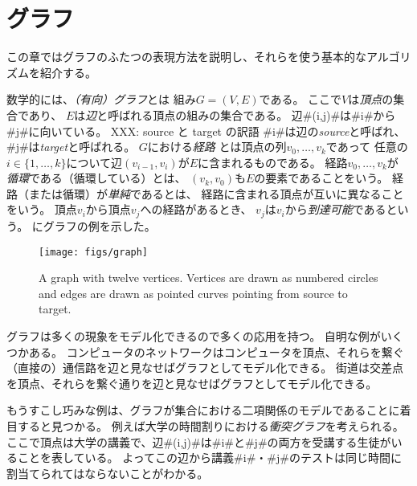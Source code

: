 \chapter{グラフ}


この章ではグラフのふたつの表現方法を説明し、それらを使う基本的なアルゴリズムを紹介する。

数学的には、\emph{（有向）グラフ}とは
%
%
組み$G=(V,E)$である。
ここで$V$は\emph{頂点}の集合であり、
%
$E$は\emph{辺}と呼ばれる頂点の組みの集合である。
%
辺#(i,j)#は#i#から#j#に向いている。
%
XXX: source と target の訳語
#i#は辺の\emph{source}と呼ばれ、
#j#は\emph{target}と呼ばれる。
$G$における\emph{経路}%
とは頂点の列$v_0,\ldots,v_k$であって 任意の$i\in\{1,\ldots,k\}$について辺$(v_{i-1},v_{i})$が$E$に含まれるものである。
経路$v_0,\ldots,v_k$が
\emph{循環}である（循環している）とは、
%
$(v_k,v_0)$も$E$の要素であることをいう。
経路（または循環）が\emph{単純}であるとは、
%
経路に含まれる頂点が互いに異なることをいう。
頂点$v_i$から頂点$v_j$への経路があるとき、
$v_j$は$v_i$から\emph{到達可能}であるという。
にグラフの例を示した。

\begin{figure}
  \begin{center}
    \texttt{[image: figs/graph]}
  \end{center}
  \caption{A graph with twelve vertices.  Vertices are drawn as numbered
    circles and edges are drawn as pointed curves pointing from source
    to target.}
\end{figure}

グラフは多くの現象をモデル化できるので多くの応用を持つ。
自明な例がいくつかある。
コンピュータのネットワークはコンピュータを頂点、それらを繋ぐ（直接の）通信路を辺と見なせばグラフとしてモデル化できる。
街道は交差点を頂点、それらを繋ぐ通りを辺と見なせばグラフとしてモデル化できる。

もうすこし巧みな例は、グラフが集合における二項関係のモデルであることに着目すると見つかる。
例えば大学の時間割りにおける\emph{衝突グラフ}を考えられる。
%
ここで頂点は大学の講義で、辺#(i,j)#は#i#と#j#の両方を受講する生徒がいることを表している。
よってこの辺から講義#i#・#j#のテストは同じ時間に割当てられてはならないことがわかる。

